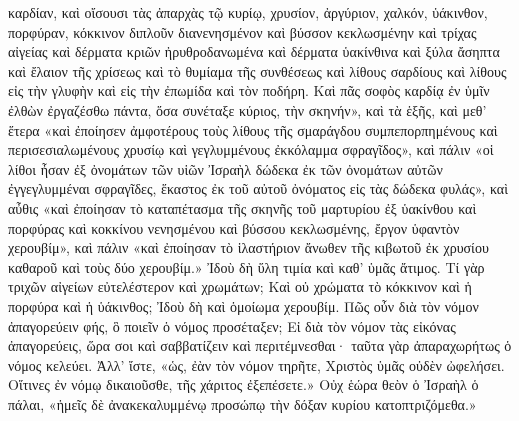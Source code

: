 \documentclass[10pt]{book}
\newcommand{\switchenglish}{\selectlanguage{english} \switchcolumn}
\begin{document}
\begin{paracol}{2}
καρδίαν, καὶ οἴσουσι τὰς ἀπαρχὰς τῷ κυρίῳ, χρυσίον, ἀργύριον, χαλκόν,
ὑάκινθον, πορφύραν, κόκκινον διπλοῦν διανενησμένον καὶ βύσσον κεκλωσμένην καὶ
τρίχας αἰγείας καὶ δέρματα κριῶν ἠρυθροδανωμένα καὶ δέρματα ὑακίνθινα καὶ ξύλα
ἄσηπτα καὶ ἔλαιον τῆς χρίσεως καὶ τὸ θυμίαμα τῆς συνθέσεως καὶ λίθους σαρδίους
καὶ λίθους εἰς τὴν γλυφὴν καὶ εἰς τὴν ἐπωμίδα καὶ τὸν ποδήρη.  Καὶ πᾶς σοφὸς
καρδίᾳ ἐν ὑμῖν ἐλθὼν ἐργαζέσθω πάντα, ὅσα συνέταξε κύριος, τὴν σκηνήν», καὶ τὰ
ἑξῆς, καὶ μεθ’ ἕτερα «καὶ ἐποίησεν ἀμφοτέρους τοὺς λίθους τῆς σμαράγδου
συμπεπορπημένους καὶ περισεσιαλωμένους χρυσίῳ καὶ γεγλυμμένους ἐκκόλαμμα
σφραγῖδος», καὶ πάλιν «οἱ λίθοι ἦσαν ἐξ ὀνομάτων τῶν υἱῶν Ἰσραὴλ δώδεκα ἐκ τῶν
ὀνομάτων αὐτῶν ἐγγεγλυμμέναι σφραγῖδες, ἕκαστος ἐκ τοῦ αὐτοῦ ὀνόματος εἰς τὰς
δώδεκα φυλάς», καὶ αὖθις «καὶ ἐποίησαν τὸ καταπέτασμα τῆς σκηνῆς τοῦ μαρτυρίου
ἐξ ὑακίνθου καὶ πορφύρας καὶ κοκκίνου νενησμένου καὶ βύσσου κεκλωσμένης, ἔργον
ὑφαντὸν χερουβίμ», καὶ πάλιν «καὶ ἐποίησαν τὸ ἱλαστήριον ἄνωθεν τῆς κιβωτοῦ ἐκ
χρυσίου καθαροῦ καὶ τοὺς δύο χερουβίμ.» Ἰδοὺ δὴ ὕλη τιμία καὶ καθ’ ὑμᾶς
ἄτιμος.  Τί γὰρ τριχῶν αἰγείων εὐτελέστερον καὶ χρωμάτων; Καὶ οὐ χρώματα τὸ
κόκκινον καὶ ἡ πορφύρα καὶ ἡ ὑάκινθος; Ἰδοὺ δὴ καὶ ὁμοίωμα χερουβίμ.  Πῶς οὖν
διὰ τὸν νόμον ἀπαγορεύειν φής, ὃ ποιεῖν ὁ νόμος προσέταξεν; Εἰ διὰ τὸν νόμον
τὰς εἰκόνας ἀπαγορεύεις, ὥρα σοι καὶ σαββατίζειν καὶ περιτέμνεσθαι· ταῦτα γὰρ
ἀπαραχωρήτως ὁ νόμος κελεύει.  Ἀλλ’ ἴστε, «ὡς, ἐὰν τὸν νόμον τηρῆτε, Χριστὸς
ὑμᾶς οὐδὲν ὠφελήσει. Οἵτινες ἐν νόμῳ δικαιοῦσθε, τῆς χάριτος ἐξεπέσετε.» Οὐχ
ἑώρα θεὸν ὁ Ἰσραὴλ ὁ πάλαι, «ἡμεῖς δὲ ἀνακεκαλυμμένῳ προσώπῳ τὴν δόξαν κυρίου
κατοπτριζόμεθα.»

\switchenglish


\end{paracol}
\end{document}
